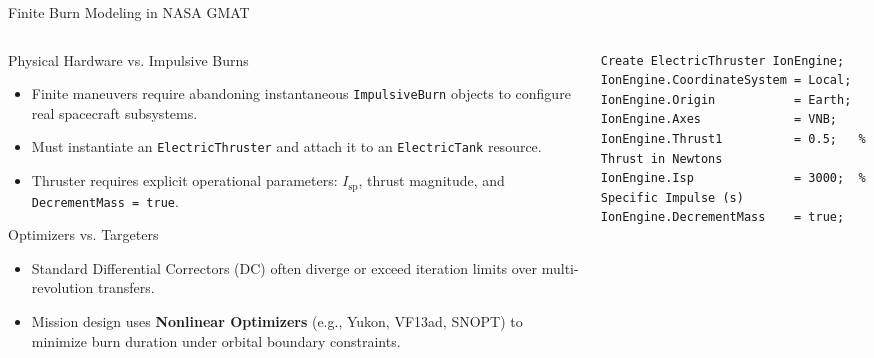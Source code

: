\documentclass[aspectratio=169, 10pt]{beamer}
\begin{document}
\begin{frame}[fragile]{Finite Burn Modeling in NASA GMAT}
    \begin{columns}[T]
        \begin{column}{0.49\textwidth}
            \begin{block}{Physical Hardware vs. Impulsive Burns}
                \scriptsize
                \begin{itemize}\setlength{\itemsep}{2pt}\setlength{\topsep}{1pt}
                    \item Finite maneuvers require abandoning instantaneous \texttt{ImpulsiveBurn} objects to configure real spacecraft subsystems.
                    \item Must instantiate an \texttt{ElectricThruster} and attach it to an \texttt{ElectricTank} resource.
                    \item Thruster requires explicit operational parameters: $I_{\text{sp}}$, thrust magnitude, and \texttt{DecrementMass = true}.
                \end{itemize}
            \end{block}
            \vspace{-0.1cm}
            \begin{alertblock}{Optimizers vs. Targeters}
                \scriptsize
                \begin{itemize}\setlength{\itemsep}{1.5pt}
                    \item Standard Differential Correctors (DC) often diverge or exceed iteration limits over multi-revolution transfers.
                    \item Mission design uses \textbf{Nonlinear Optimizers} (e.g., Yukon, VF13ad, SNOPT) to minimize burn duration under orbital boundary constraints.
                \end{itemize}
            \end{alertblock}
        \end{column}

        \begin{column}{0.49\textwidth}
\begin{lstlisting}[style=gmatstyle]
% 1. Spacecraft Hardware Configuration
Create ElectricThruster IonEngine;
IonEngine.CoordinateSystem = Local;
IonEngine.Origin           = Earth;
IonEngine.Axes             = VNB;
IonEngine.Thrust1          = 0.5;   % Thrust in Newtons
IonEngine.Isp              = 3000;  % Specific Impulse (s)
IonEngine.DecrementMass    = true;


\end{lstlisting}
\end{column}
\end{columns}
\end{frame}
\end{document}
